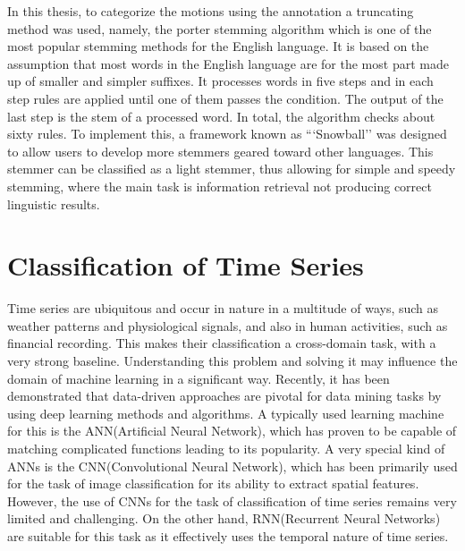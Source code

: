 In this thesis, to categorize the motions using the annotation a truncating method was used, namely, the porter stemming algorithm which is one of the most popular stemming methods for the English language. It is based on the assumption that most words in the English language are for the most part made up of smaller and simpler suffixes. It processes words in five steps and in each step rules are applied until one of them passes the condition. The output of the last step is the stem of a processed word. In total, the algorithm checks about sixty rules. To implement this, a framework known as ```Snowball'' was designed to allow users to develop more stemmers geared toward other languages. This stemmer can be classified as a light stemmer, thus allowing for simple and speedy stemming, where the main task is information retrieval not producing correct linguistic results.\cite{jivani2011comparative}
\section{Classification of Time Series}
Time series are ubiquitous and occur in nature in a multitude of ways, such as weather patterns and physiological signals, and also in human activities, such as financial recording. This makes their classification a cross-domain task, with a very strong baseline. Understanding this problem and solving it may influence the domain of machine learning in a significant way\cite{wang2017time}. Recently, it has been demonstrated that data-driven approaches are pivotal for data mining tasks by using deep learning methods and algorithms. A typically used learning machine for this is the ANN(Artificial Neural Network), which has proven to be capable of matching complicated functions leading to its popularity. A very special kind of ANNs is the CNN(Convolutional Neural Network), which has been primarily used for the task of image classification for its ability to extract spatial features. However, the use of CNNs for the task of classification of time series remains very limited and challenging. On the other hand, RNN(Recurrent Neural Networks) are suitable for this task as it effectively uses the temporal nature of time series.\cite{yang2019time}
